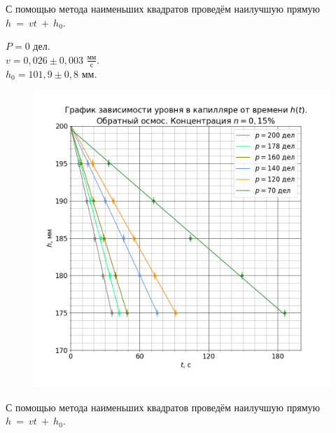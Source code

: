 С помощью метода наименьших квадратов проведём наилучшую прямую $h~=~vt~+~h_0$.

$P = 0$ дел. \\
$v = 0,026 \pm 0,003$ $\frac{мм}{с}$. \\
$h_0 = 101,9 \pm 0,8$ мм.

\begin{figure}[H]
	\centering
	\includegraphics[width=1 \textwidth]{../plots/graph h_t n0.15 reverse.png}
\end{figure}

С помощью метода наименьших квадратов проведём наилучшую прямую $h~=~vt~+~h_0$.




